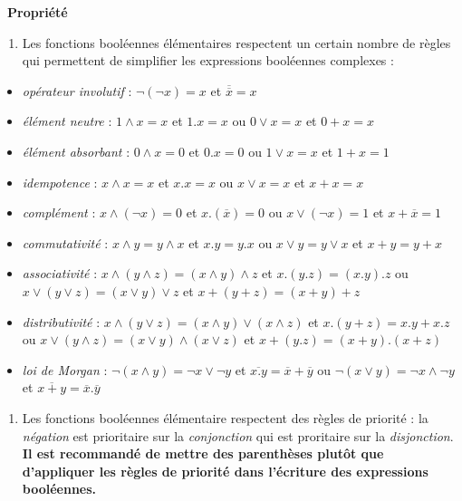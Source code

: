 \documentclass[
  11pt,
]{article}
\providecommand{\tightlist}{%
  \setlength{\itemsep}{0pt}\setlength{\parskip}{0pt}}
\newcounter{prop}
\newenvironment{propriete}[1]
{\par \medskip   \addtocounter{prop}{1} \noindent  
\begin{bclogo}[arrondi =0.1,  ombre = true, barre=none, logo=\bcbook, marge=4]{~\textbf{Propriété} \textbf{\theprop} {\itshape #1} }   \par}
{
\end{bclogo}
 \par \bigskip }
\newcounter{def}
\begin{document}
\begin{propriete}{}

\begin{enumerate}
\def\labelenumi{\arabic{enumi}.}
\tightlist
\item
  Les fonctions booléennes élémentaires respectent un certain nombre de
  règles qui permettent de simplifier les expressions booléennes
  complexes :
\end{enumerate}

\begin{itemize}
\tightlist
\item
  \emph{opérateur involutif} : \(\neg(\neg x) = x\) et
  \(\overline{\overline{x}}=x\)
\item
  \emph{élément neutre} : \(1 \wedge x = x\) et \(1 . x =x\) ou
  \(0 \vee x = x\) et \(0 + x =x\)
\item
  \emph{élément absorbant} : \(0 \wedge x = 0\) et \(0 . x =0\) ou
  \(1 \vee x = x\) et \(1 + x =1\)
\item
  \emph{idempotence} : \(x \wedge x = x\) et \(x . x =x\) ou
  \(x \vee x = x\) et \(x + x =x\)
\item
  \emph{complément} : \(x \wedge (\neg x) = 0\) et
  \(x . (\overline{x}) =0\) ou \(x \vee (\neg x) = 1\) et
  \(x + \overline{x} =1\)
\item
  \emph{commutativité} : \(x \wedge y = y \wedge x\) et
  \(x . y = y . x\) ou \(x \vee y = y \vee x\) et \(x + y = y + x\)
\item
  \emph{associativité} :
  \(x \wedge ( y \wedge z) = (x \wedge y) \wedge z\) et
  \(x . (y . z) = (x . y) . z\) ou
  \(x \vee ( y \vee z) = (x \vee y) \vee z\) et
  \(x + (y + z) = (x + y) + z\)
\item
  \emph{distributivité} :
  \(x \wedge ( y \vee z) = (x \wedge y) \vee (x \wedge z)\) et
  \(x . (y + z) = x . y + x . z\) ou
  \(x \vee ( y \wedge z) = (x \vee y) \wedge (x \vee z)\) et
  \(x + (y . z) = (x + y) . (x + z)\)
\item
  \emph{loi de Morgan} : \(\neg(x \wedge y) = \neg x \vee \neg y\) et
  \(\overline{x . y} = \overline{x} + \overline{y}\) ou
  \(\neg(x \vee y) = \neg x \wedge \neg y\) et
  \(\overline{x + y} = \overline{x} . \overline{y}\)
\end{itemize}

\begin{enumerate}
\def\labelenumi{\arabic{enumi}.}
\tightlist
\item
  Les fonctions booléennes élémentaire respectent des règles de priorité
  : la \emph{négation} est prioritaire sur la \emph{conjonction} qui est
  proritaire sur la \emph{disjonction}.\\
  \textbf{Il est recommandé de mettre des parenthèses plutôt que
  d'appliquer les règles de priorité dans l'écriture des expressions
  booléennes.}
\end{enumerate}

\end{propriete}
\end{document}
